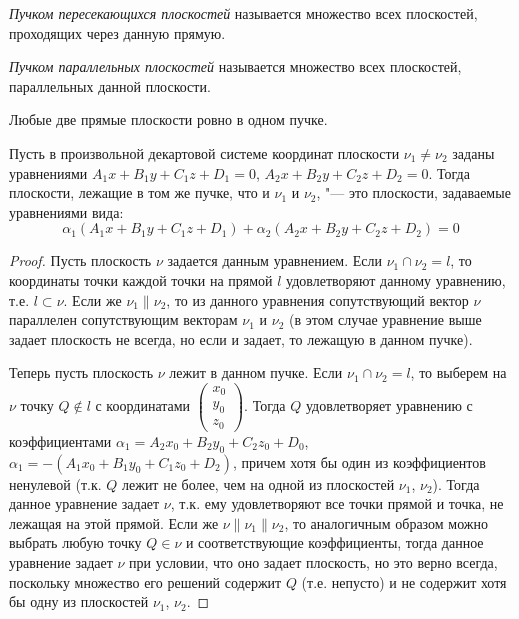 \begin{definition}
	\textit{Пучком пересекающихся плоскостей} называется множество всех плоскостей, проходящих через данную прямую.
\end{definition}

\begin{definition}
	\textit{Пучком параллельных плоскостей} называется множество всех плоскостей, параллельных данной плоскости.
\end{definition}

\begin{note}
	Любые две прямые плоскости ровно в одном пучке.
\end{note}

\begin{theorem}
	Пусть в произвольной декартовой системе координат плоскости $\nu_1 \ne \nu_2$ заданы уравнениями $A_1x+B_1y+C_1z+D_1=0$, $A_2x+B_2y+C_2z+D_2=0$. Тогда плоскости, лежащие в том же пучке, что и $\nu_1$ и $\nu_2$, "--- это плоскости, задаваемые уравнениями вида:
	\[\alpha_1(A_1x+B_1y+C_1z+D_1) + \alpha_2(A_2x+B_2y+C_2z+D_2) = 0\]
\end{theorem}

\begin{proof}
	Пусть плоскость $\nu$ задается данным уравнением. Если $\nu_1 \cap \nu_2 = l$, то координаты точки каждой точки на прямой $l$ удовлетворяют данному уравнению, т.\:е. $l \subset \nu$. Если же $\nu_1 \parallel \nu_2$, то из данного уравнения сопутствующий вектор $\nu$ параллелен сопутствующим векторам $\nu_1$ и $\nu_2$ (в этом случае уравнение выше задает плоскость не всегда, но если и задает, то лежащую в данном пучке).
	
	Теперь пусть плоскость $\nu$ лежит в данном пучке. Если $\nu_1 \cap \nu_2 = l$, то выберем на $\nu$ точку $Q \not\in l$ с координатами $\begin{pmatrix}x_0\\y_0\\z_0\end{pmatrix}$. Тогда $Q$ удовлетворяет уравнению с коэффициентами $\alpha_1 = A_2x_0+B_2y_0+C_2z_0+D_0$, $\alpha_1 = -(A_1x_0+B_1y_0+C_1z_0+D_2)$, причем хотя бы один из коэффициентов ненулевой (т.\:к. $Q$ лежит не более, чем на одной из плоскостей $\nu_1$, $\nu_2$). Тогда данное уравнение задает $\nu$, т.\:к. ему удовлетворяют все точки прямой и точка, не лежащая на этой прямой. Если же $\nu \parallel \nu_1 \parallel \nu_2$, то аналогичным образом можно выбрать любую точку $Q \in \nu$ и соответствующие коэффициенты, тогда данное уравнение задает $\nu$ при условии, что оно задает плоскость, но это верно всегда, поскольку множество его решений содержит $Q$ (т.\:е. непусто) и не содержит хотя бы одну из плоскостей $\nu_1$, $\nu_2$.
\end{proof}

